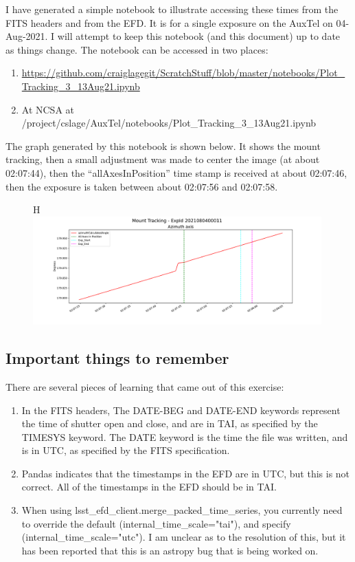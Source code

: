 \documentclass[SE,authoryear,toc]{lsstdoc}
\begin{document}
I have generated a simple notebook to illustrate accessing these times from the FITS headers and from the EFD.  It is for a single exposure on the AuxTel on 04-Aug-2021.  I will attempt to keep this notebook (and this document) up to date as things change.  The notebook can be accessed in two places:
\begin{enumerate}
  \item \url{https://github.com/craiglagegit/ScratchStuff/blob/master/notebooks/Plot_Tracking_3_13Aug21.ipynb}
  \item At NCSA at /project/cslage/AuxTel/notebooks/Plot\_Tracking\_3\_13Aug21.ipynb
\end{enumerate}

The graph generated by this notebook is shown below.  It shows the mount tracking, then a small adjustment was made to center the image (at about 02:07:44), then the ``allAxesInPosition'' time stamp is received at about 02:07:46, then the exposure is taken between about 02:07:56 and 02:07:58.

  \begin {figure} {H}
    \centering
    \includegraphics[trim=0.0in 0.0in 0.0in 0.0in,clip,width=0.99\textwidth]{Tracking_Timebase_2021080400011_13Aug21.pdf}
  \end{figure}

\subsection{Important things to remember}

There are several pieces of learning that came out of this exercise:
\begin{enumerate}
  \item In the FITS headers, The DATE-BEG and DATE-END keywords represent the time of shutter open and close, and are in TAI, as specified by the TIMESYS keyword.  The DATE keyword is the time the file was written, and is in UTC, as specified by the FITS specification.
  \item Pandas indicates that the timestamps in the EFD are in UTC, but this is not correct.  All of the timestamps in the EFD should be in TAI.
    \item When using lsst\_efd\_client.merge\_packed\_time\_series, you currently need to override the default (internal\_time\_scale="tai"), and specify (internal\_time\_scale="utc").  I am unclear as to the resolution of this, but it has been reported that this is an astropy bug that is being worked on.
\end{enumerate}
\end{document}
